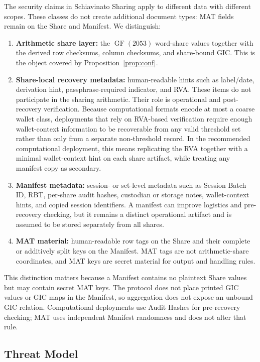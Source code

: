 \documentclass[11pt]{article}
\newcommand{\GF}{\operatorname{GF}}
\begin{document}
The security claims in Schiavinato Sharing apply to different data with different scopes. These classes do not create additional document types: MAT fields remain on the Share and Manifest. We distinguish:
\begin{enumerate}[noitemsep]
    \item \textbf{Arithmetic share layer:} the $\GF(2053)$ word-share values together with the derived row checksums, column checksums, and share-bound GIC. This is the object covered by Proposition~\ref{prop:conf}.
    \item \textbf{Share-local recovery metadata:} human-readable hints such as label/date, derivation hint, passphrase-required indicator, and RVA. These items do not participate in the sharing arithmetic. Their role is operational and post-recovery verification. Because computational formats encode at most a coarse wallet class, deployments that rely on RVA-based verification require enough wallet-context information to be recoverable from any valid threshold set rather than only from a separate non-threshold record. In the recommended computational deployment, this means replicating the RVA together with a minimal wallet-context hint on each share artifact, while treating any manifest copy as secondary.
    \item \textbf{Manifest metadata:} session- or set-level metadata such as Session Batch ID, RBT, per-share audit hashes, custodian or storage notes, wallet-context hints, and copied session identifiers. A manifest can improve logistics and pre-recovery checking, but it remains a distinct operational artifact and is assumed to be stored separately from all shares.
    \item \textbf{MAT material:} human-readable row tags on the Share and their complete or additively split keys on the Manifest. MAT tags are not arithmetic-share coordinates, and MAT keys are secret material for output and handling rules.
\end{enumerate}

This distinction matters because a Manifest contains no plaintext Share values but may contain secret MAT keys. The protocol does not place printed GIC values or GIC maps in the Manifest, so aggregation does not expose an unbound GIC relation. Computational deployments use Audit Hashes for pre-recovery checking; MAT uses independent Manifest randomness and does not alter that rule.

\subsection{Threat Model}
\label{sec:threat-model}
\end{document}
